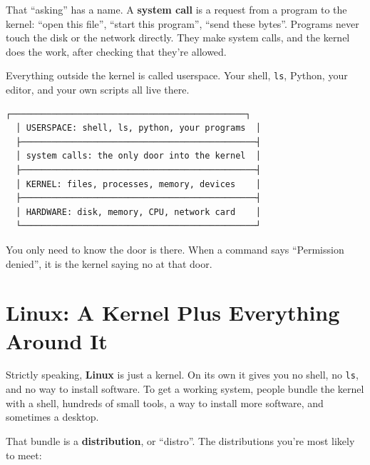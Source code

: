 That ``asking'' has a name. A \textbf{system call} is a request from a program to the kernel: ``open this file'', ``start this program'', ``send these bytes''. Programs never touch the disk or the network directly. They make system calls, and the kernel does the work, after checking that they're allowed.

Everything outside the kernel is called userspace. Your shell, \texttt{ls}, Python, your editor, and your own scripts all live there.

\begin{codeblock}
\begin{Verbatim}[breaklines=false, fontsize=\fontsize{8.8}{8.68}\selectfont, fontfamily=diagrammono, formatcom=\diagramlines]
  ┌──────────────────────────────────────────────┐
  │ USERSPACE: shell, ls, python, your programs  │
  ├──────────────────────────────────────────────┤
  │ system calls: the only door into the kernel  │
  ├──────────────────────────────────────────────┤
  │ KERNEL: files, processes, memory, devices    │
  ├──────────────────────────────────────────────┤
  │ HARDWARE: disk, memory, CPU, network card    │
  └──────────────────────────────────────────────┘
\end{Verbatim}
\end{codeblock}

You only need to know the door is there. When a command says ``Permission denied'', it is the kernel saying no at that door.

\section{Linux: A Kernel Plus Everything Around It}\label{01-the-machine-behind-the-terminal:linux-a-kernel-plus-everything-around-it}

Strictly speaking, \textbf{Linux} is just a kernel. On its own it gives you no shell, no \texttt{ls}, and no way to install software. To get a working system, people bundle the kernel with a shell, hundreds of small tools, a way to install more software, and sometimes a desktop.


That bundle is a \textbf{distribution}, or ``distro''. The distributions you're most likely to meet:

